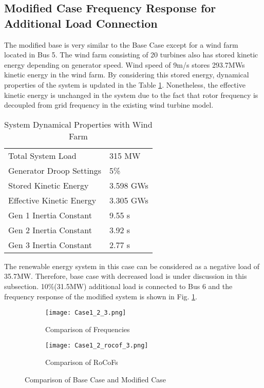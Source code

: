 \subsection{Modified Case Frequency Response for Additional Load Connection}
The modified base is very similar to the Base Case except for a wind farm located in Bus 5. The wind farm consisting of 20 turbines also has stored kinetic energy depending on generator speed. Wind speed of 9m/s stores 293.7MWs kinetic energy in the wind farm. By considering this stored energy, dynamical properties of the system is updated in the Table \ref{systemdynamicaldatamod}. Nonetheless, the effective kinetic energy is unchanged in the system due to the fact that rotor frequency is decoupled from grid frequency in the existing wind turbine model.\par
\begin{table}[h]
	\centering
	\begin{tabular}{ll}
		\hline
		Total System Load                      & 315 MW    \\
		Generator Droop Settings               & 5\%       \\
		Stored Kinetic Energy                  & 3.598 GWs \\
		Effective Kinetic Energy               & 3.305 GWs \\
		Gen 1 Inertia Constant                 & 9.55 s  \\
		Gen 2 Inertia Constant                 & 3.92 s  \\
		Gen 3 Inertia Constant                 & 2.77 s  \\ \hline
	\end{tabular}
	\caption{System Dynamical Properties with Wind Farm}
	\label{systemdynamicaldatamod}
\end{table}
The renewable energy system in this case can be considered as a negative load of 35.7MW. Therefore, base case with decreased load is under discussion in this subsection. 10\%(31.5MW) additional load is connected to Bus 6 and the frequency response of the modified system is shown in Fig. \ref{Case1_2_freq}. \par
\begin{figure}[h!]
	\centering
		\begin{subfigure}{0.9\textwidth} %
			\centering
		\texttt{[image: Case1\_2\_3.png]}
		\caption{Comparison of Frequencies}		
		\label{Case1_2_freq}
		\end{subfigure}
		\vspace{0.1em} %
	\begin{subfigure}{0.9\textwidth}
\centering	\texttt{[image: Case1\_2\_rocof\_3.png]}
	\caption{Comparison of RoCoFs}
	\label{Case1_2_rocof}	
	\end{subfigure}
	\caption{Comparison of Base Case and Modified Case}
\end{figure}
